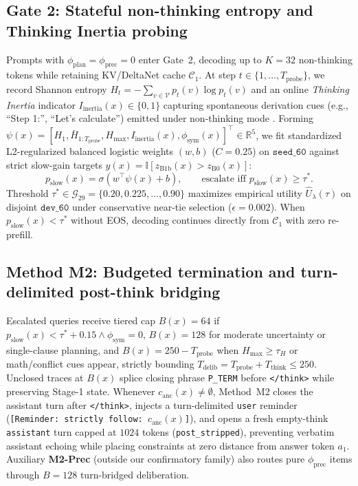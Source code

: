 \documentclass{article}
\begin{document}
\subsection{Gate 2: Stateful non-thinking entropy and Thinking Inertia probing}
Prompts with $\phi_{\text{plan}} = \phi_{\text{prec}} = 0$ enter Gate~2, decoding up to $K = 32$ non-thinking tokens while retaining KV/DeltaNet cache $\mathcal{C}_1$. At step $t \in \{1, \dots, T_{\text{probe}}\}$, we record Shannon entropy $H_t = -\sum_{v \in \mathcal{V}} p_t(v) \log p_t(v)$ and an online \emph{Thinking Inertia} indicator $I_{\text{inertia}}(x) \in \{0, 1\}$ capturing spontaneous derivation cues (e.g., ``Step 1:'', ``Let's calculate'') emitted under non-thinking mode \cite{lei2026thinkinginertia,zhu2026savethinking}. Forming $\psi(x) = [H_1, \bar{H}_{1:T_{\text{probe}}}, H_{\max}, I_{\text{inertia}}(x), \phi_{\text{sym}}(x)]^\top \in \mathbb{R}^5$, we fit standardized L2-regularized balanced logistic weights $(w, b)$ ($C = 0.25$) on $\texttt{seed\_60}$ against strict slow-gain targets $y(x) = \mathbb{I}[z_{\text{B1b}}(x) > z_{\text{B0}}(x)]$:
\begin{equation}
\label{eq:gate2}
p_{\text{slow}}(x) = \sigma\!\left(w^\top \psi(x) + b\right), \qquad \text{escalate iff } p_{\text{slow}}(x) \ge \tau^*.
\end{equation}
Threshold $\tau^* \in \mathcal{G}_{29} = \{0.20, 0.225, \dots, 0.90\}$ maximizes empirical utility $\hat{U}_\lambda(\tau)$ on disjoint $\texttt{dev\_60}$ under conservative near-tie selection ($\epsilon = 0.002$). When $p_{\text{slow}}(x) < \tau^*$ without EOS, decoding continues directly from $\mathcal{C}_1$ with zero re-prefill.

\subsection{Method M2: Budgeted termination and turn-delimited post-think bridging}
Escalated queries receive tiered cap $B(x) = 64$ if $p_{\text{slow}}(x) < \tau^* + 0.15 \land \phi_{\text{sym}} = 0$, $B(x) = 128$ for moderate uncertainty or single-clause planning, and $B(x) = 250 - T_{\text{probe}}$ when $H_{\max} \ge \tau_H$ or math/conflict cues appear, strictly bounding $T_{\text{delib}} = T_{\text{probe}} + T_{\text{think}} \le 250$. Unclosed traces at $B(x)$ splice closing phrase \texttt{P\_TERM} before \texttt{</think>} \cite{ma2025nothinking} while preserving Stage-1 state. Whenever $c_{\text{anc}}(x) \neq \emptyset$, Method~M2 closes the assistant turn after \texttt{</think>}, injects a turn-delimited \texttt{user} reminder (\texttt{[Reminder: strictly follow: $c_{\text{anc}}(x)$]}), and opens a fresh empty-think \texttt{assistant} turn capped at $1024$ tokens (\texttt{post\_stripped}), preventing verbatim assistant echoing while placing constraints at zero distance from answer token $a_1$. Auxiliary \textbf{M2-Prec} (outside our confirmatory family) also routes pure $\phi_{\text{prec}}$ items through $B=128$ turn-bridged deliberation.
\end{document}
